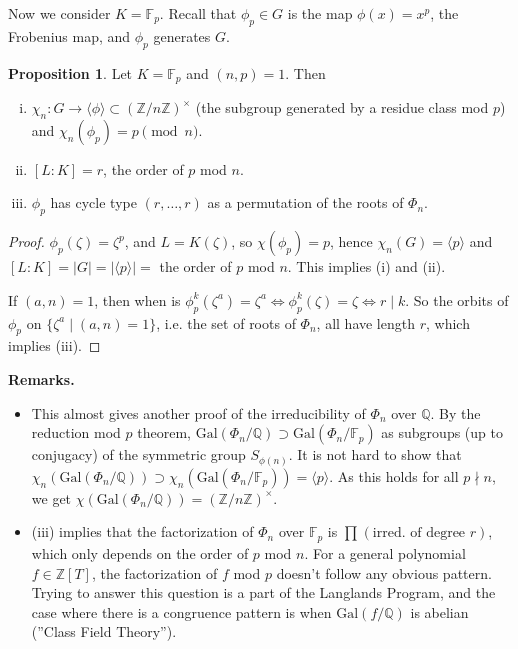 \documentclass{article}
\theoremstyle{definition}
\newtheorem{prop}[theorem]{Proposition}
\begin{document}
Now we consider $K=\mathbb{F}_p$. Recall that $\phi_p \in G$ is the map $\phi(x)=x^p$, the Frobenius map, and $\phi_p$ generates $G$.
\begin{prop}
    Let $K=\mathbb{F}_p$ and $(n,p)=1$. Then
    \begin{enumerate}[(i)]
        \item $\chi_n : G \to \langle \phi \rangle \subset (\mathbb{Z}/n\mathbb{Z})^\times$ (the subgroup generated by a residue class mod $p$) and $\chi_n(\phi_p)=p \pmod{n}$.
        \item $[L:K]=r$, the order of $p$ mod $n$.
        \item $\phi_p$ has cycle type $(r,\ldots,r)$ as a permutation of the roots of $\Phi_n$.
    \end{enumerate}
\end{prop}
\begin{proof}
    $\phi_p(\zeta)=\zeta^p$, and $L=K(\zeta)$, so $\chi(\phi_p)=p$, hence $\chi_n(G)=\langle p \rangle$ and $[L:K] = |G| = |\langle p \rangle| =$ the order of $p$ mod $n$. This implies (i) and (ii).
    \vspace{1mm}
    
    If $(a,n)=1$, then when is $\phi_p^k(\zeta^a)=\zeta^a \iff \phi_p^k(\zeta)=\zeta \iff r \mid k$. So the orbits of $\phi_p$ on $\{\zeta^a \mid (a,n)=1\}$, i.e. the set of roots of $\Phi_n$, all have length $r$, which implies (iii). 
\end{proof} 
\textbf{Remarks.}
\begin{itemize}
    \item This almost gives another proof of the irreducibility of $\Phi_n$ over $\mathbb{Q}$. By the reduction mod $p$ theorem, $\text{Gal}(\Phi_n/\mathbb{Q}) \supset \text{Gal}(\Phi_n/\mathbb{F}_p)$ as subgroups (up to conjugacy) of the symmetric group $S_{\phi(n)}$. It is not hard to show that $\chi_n(\text{Gal}(\Phi_n/\mathbb{Q})) \supset \chi_n(\text{Gal}(\Phi_n/\mathbb{F}_p)) = \langle p \rangle$. As this holds for all $p \nmid n$, we get $\chi(\text{Gal}(\Phi_n/\mathbb{Q}))=(\mathbb{Z}/n\mathbb{Z})^\times$.
    \item (iii) implies that the factorization of $\Phi_n$ over $\mathbb{F}_p$ is $\prod_{}^{} (\text{irred. of degree }r)$, which only depends on the order of $p$ mod $n$. For a general polynomial $f \in \mathbb{Z}[T]$, the factorization of $f$ mod $p$ doesn't follow any obvious pattern. Trying to answer this question is a part of the Langlands Program, and the case where there is a congruence pattern is when $\text{Gal}(f/\mathbb{Q})$ is abelian (''Class Field Theory'').
\end{itemize}
\end{document}
